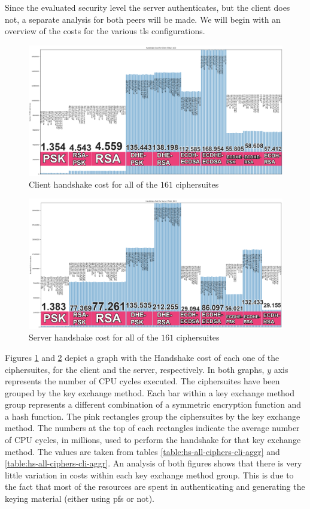 \documentclass{llncs}
\begin{document}
Since the evaluated security level the server authenticates, but the client does not,
a separate analysis for both peers will be made. We will begin with an overview of the costs for the various \gls{tls}
configurations.

\begin{figure}
  \centering
  \includegraphics[width=1.0\textwidth]{img/hs_cost_cli.png}
  \centering \caption{\label{fig:hs-all-ciphers-cli} Client handshake cost for all of the $161$ ciphersuites}
\end{figure}

\begin{figure}
  \centering
  \includegraphics[width=1.0\textwidth]{img/hs_cost_srv.png}
  \centering \caption{\label{fig:hs-all-ciphers-srv} Server handshake cost for all of the $161$ ciphersuites}
\end{figure}

Figures \ref{fig:hs-all-ciphers-cli} and \ref{fig:hs-all-ciphers-srv} depict a graph with the Handshake cost of each one
of the ciphersuites, for the client and the server, respectively. In both graphs, $y$ axis represents the number of
CPU cycles executed. The ciphersuites have been grouped by the key exchange method. Each bar within a key
exchange method group represents a different combination of a symmetric encryption function and a hash function.
The pink rectangles group the ciphersuites by the key exchange method. The numbers at the top of each rectangles indicate the average
number of CPU  cycles, in millions, used to perform the handshake for that key exchange method. The values are taken
from tables \ref{table:hs-all-ciphers-cli-aggr} and \ref{table:hs-all-ciphers-cli-aggr}.
An analysis of both figures shows that there is very little variation in costs within
each key exchange method group. This is due to the fact that most of the resources are spent in authenticating and
generating the keying material (either using \gls{pfs} or not).
\end{document}
